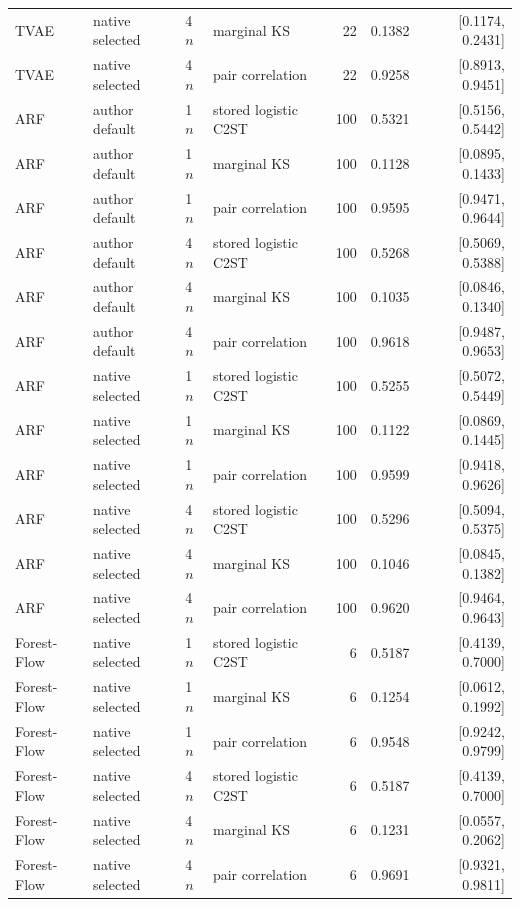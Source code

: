 \begin{longtable}{llllrrr}
TVAE & native selected & 4$n$ & marginal KS & 22 & 0.1382 & [0.1174, 0.2431] \\
TVAE & native selected & 4$n$ & pair correlation & 22 & 0.9258 & [0.8913, 0.9451] \\
ARF & author default & 1$n$ & stored logistic C2ST & 100 & 0.5321 & [0.5156, 0.5442] \\
ARF & author default & 1$n$ & marginal KS & 100 & 0.1128 & [0.0895, 0.1433] \\
ARF & author default & 1$n$ & pair correlation & 100 & 0.9595 & [0.9471, 0.9644] \\
ARF & author default & 4$n$ & stored logistic C2ST & 100 & 0.5268 & [0.5069, 0.5388] \\
ARF & author default & 4$n$ & marginal KS & 100 & 0.1035 & [0.0846, 0.1340] \\
ARF & author default & 4$n$ & pair correlation & 100 & 0.9618 & [0.9487, 0.9653] \\
ARF & native selected & 1$n$ & stored logistic C2ST & 100 & 0.5255 & [0.5072, 0.5449] \\
ARF & native selected & 1$n$ & marginal KS & 100 & 0.1122 & [0.0869, 0.1445] \\
ARF & native selected & 1$n$ & pair correlation & 100 & 0.9599 & [0.9418, 0.9626] \\
ARF & native selected & 4$n$ & stored logistic C2ST & 100 & 0.5296 & [0.5094, 0.5375] \\
ARF & native selected & 4$n$ & marginal KS & 100 & 0.1046 & [0.0845, 0.1382] \\
ARF & native selected & 4$n$ & pair correlation & 100 & 0.9620 & [0.9464, 0.9643] \\
Forest-Flow & native selected & 1$n$ & stored logistic C2ST & 6 & 0.5187 & [0.4139, 0.7000] \\
Forest-Flow & native selected & 1$n$ & marginal KS & 6 & 0.1254 & [0.0612, 0.1992] \\
Forest-Flow & native selected & 1$n$ & pair correlation & 6 & 0.9548 & [0.9242, 0.9799] \\
Forest-Flow & native selected & 4$n$ & stored logistic C2ST & 6 & 0.5187 & [0.4139, 0.7000] \\
Forest-Flow & native selected & 4$n$ & marginal KS & 6 & 0.1231 & [0.0557, 0.2062] \\
Forest-Flow & native selected & 4$n$ & pair correlation & 6 & 0.9691 & [0.9321, 0.9811] \\
\bottomrule
\end{longtable}
